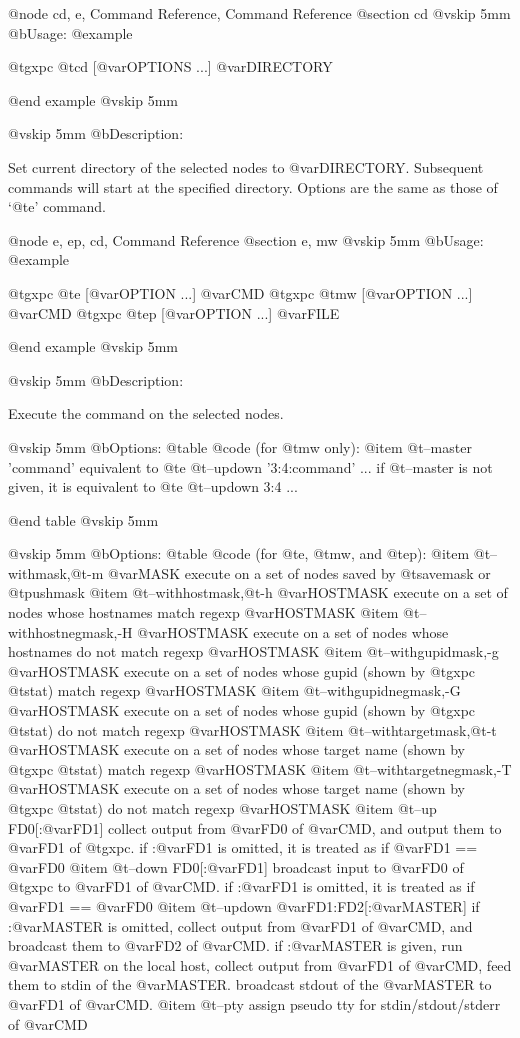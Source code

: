 @node cd, e, Command Reference, Command Reference
@section cd
@vskip 5mm
@b{Usage:}
@example

  @t{gxpc} @t{cd} [@var{OPTIONS} ...] @var{DIRECTORY}

@end example
@vskip 5mm

@vskip 5mm
@b{Description:}


  Set current directory of the selected nodes to @var{DIRECTORY}.
Subsequent commands will start at the specified directory.
Options are the same as those of `@t{e}' command.

@node e, ep, cd, Command Reference
@section e, mw
@vskip 5mm
@b{Usage:}
@example

  @t{gxpc} @t{e}  [@var{OPTION} ...] @var{CMD}
  @t{gxpc} @t{mw} [@var{OPTION} ...] @var{CMD}
  @t{gxpc} @t{ep} [@var{OPTION} ...] @var{FILE}

@end example
@vskip 5mm

@vskip 5mm
@b{Description:}


  Execute the command on the selected nodes.

@vskip 5mm
@b{Options: }
@table @code
(for @t{mw} only):
@item   @t{--master} 'command'
    equivalent to @t{e} @t{--updown} '3:4:command' ...
  if @t{--master} is not given, it is equivalent to @t{e} @t{--updown} 3:4 ...

@end table
@vskip 5mm

@vskip 5mm
@b{Options: }
@table @code
(for @t{e}, @t{mw}, and @t{ep}):
@item   @t{--withmask},@t{-m} @var{MASK}
    execute on a set of nodes saved by @t{savemask} or @t{pushmask}
@item   @t{--withhostmask},@t{-h} @var{HOSTMASK}
    execute on a set of nodes whose hostnames match regexp @var{HOSTMASK}
@item   @t{--withhostnegmask},-H @var{HOSTMASK}
    execute on a set of nodes whose hostnames do not match regexp @var{HOSTMASK}
@item   @t{--withgupidmask},-g @var{HOSTMASK}
    execute on a set of nodes whose gupid (shown by @t{gxpc} @t{stat}) 
    match regexp @var{HOSTMASK}
@item   @t{--withgupidnegmask},-G @var{HOSTMASK}
    execute on a set of nodes whose gupid (shown by @t{gxpc} @t{stat}) 
    do not match regexp @var{HOSTMASK}
@item   @t{--withtargetmask},@t{-t} @var{HOSTMASK}
    execute on a set of nodes whose target name (shown by @t{gxpc} @t{stat}) 
    match regexp @var{HOSTMASK}
@item   @t{--withtargetnegmask},-T @var{HOSTMASK}
    execute on a set of nodes whose target name (shown by @t{gxpc} @t{stat}) 
    do not match regexp @var{HOSTMASK}
@item   @t{--up} FD0[:@var{FD1}]
    collect output from @var{FD0} of @var{CMD}, and output them to @var{FD1} of @t{gxpc}.
    if :@var{FD1} is omitted, it is treated as if @var{FD1} == @var{FD0}
@item   @t{--down} FD0[:@var{FD1}]
    broadcast input to @var{FD0} of @t{gxpc} to @var{FD1} of @var{CMD}.
    if :@var{FD1} is omitted, it is treated as if @var{FD1} == @var{FD0}
@item   @t{--updown} @var{FD1}:FD2[:@var{MASTER}]
    if :@var{MASTER} is omitted, collect output from @var{FD1} of @var{CMD},
    and broadcast them to @var{FD2} of @var{CMD}.
    if :@var{MASTER} is given, run @var{MASTER} on the local host, collect
    output from @var{FD1} of @var{CMD}, feed them to stdin of the @var{MASTER}.
    broadcast stdout of the @var{MASTER} to @var{FD1} of @var{CMD}.
@item   @t{--pty}
    assign pseudo tty for stdin/stdout/stderr of @var{CMD}

